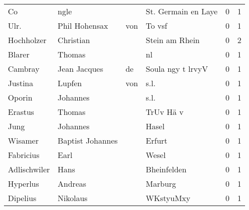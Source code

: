 \begin{center}
\begin{tiny}
\begin{longtabu}{llllrr}
                       Co &                               ngle &             &                         St. Germain en Laye &          0 &         1 \\
                     Ulr. &                     Phil  Hohensax &         von &                                      To vsf &          0 &         1 \\
               Hochholzer &                          Christian &             &                              Stein am Rhein &          0 &         2 \\
                   Blarer &                             Thomas &             &                                          nl &          0 &         1 \\
                  Cambray &                       Jean Jacques &          de &                           Soula ngy t lrvyV &          0 &         1 \\
                  Justina &                             Lupfen &         von &                                        s.l. &          0 &         1 \\
                   Oporin &                           Johannes &             &                                        s.l. &          0 &         1 \\
                  Erastus &                             Thomas &             &                                   TrUv Hä v &          0 &         1 \\
                     Jung &                           Johannes &             &                                       Hasel &          0 &         1 \\
                  Wisamer &                   Baptist Johannes &             &                                      Erfurt &          0 &         1 \\
                Fabricius &                               Earl &             &                                       Wesel &          0 &         1 \\
             Adlischwiler &                               Hans &             &                                 Bheinfelden &          0 &         1 \\
                 Hyperlus &                            Andreas &             &                                     Marburg &          0 &         1 \\
                 Dipelius &                           Nikolaus &             &                                   WKstyuMxy &          0 &         1 \\

\end{longtabu}
\end{tiny}
\end{center}
